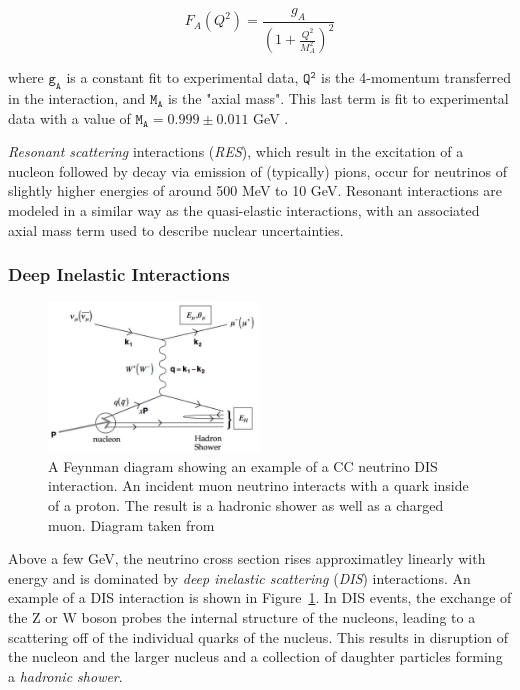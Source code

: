 \begin{equation}
F_A\left(Q^2\right) = \frac{g_A}{\left(1+\frac{Q^2}{M_A^2}\right)^2}
\label{eq:axial_mass_eq}
\end{equation}

where $\mathtt{g_A}$ is a constant fit to experimental data, $\mathtt{Q^2}$ is the 4-momentum transferred in the interaction, and $\mathtt{M_A}$ is the "axial mass".
This last term is fit to experimental data with a value of $\mathtt{M_A = 0.999 \pm 0.011}$ GeV \cite{Formaggio-Xsec}.

\emph{Resonant scattering} interactions (\emph{RES}), which result in the excitation of a nucleon followed by decay via emission of (typically) pions, occur for neutrinos of slightly higher energies of around 500 MeV to 10 GeV.
Resonant interactions are modeled in a similar way as the quasi-elastic interactions, with an associated axial mass term used to describe nuclear uncertainties.

\subsubsection{Deep Inelastic Interactions}
\begin{figure}
\centering
\includegraphics[width=0.5\textwidth]{dis_feynman.png}
\caption{A Feynman diagram showing an example of a CC neutrino DIS interaction. An incident muon neutrino interacts with a quark inside of a proton. The result is a hadronic shower as well as a charged muon. Diagram taken from \cite{Formaggio-Xsec}}
\label{fig:dis_feynman}
\end{figure}

Above a few GeV, the neutrino cross section rises approximatley linearly with energy and is dominated by \emph{deep inelastic scattering} (\emph{DIS}) interactions.
An example of a DIS interaction is shown in Figure~\ref{fig:dis_feynman}.
In DIS events, the exchange of the Z or W boson probes the internal structure of the nucleons, leading to a scattering off of the individual quarks of the nucleus.
This results in disruption of the nucleon and the larger nucleus and a collection of daughter particles forming a \emph{hadronic shower}.

